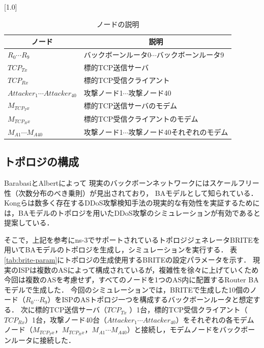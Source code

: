 \documentclass[Japanese]{dicomopapers}
\begin{document}
\begin{table}[htbp]
    \caption{ノードの説明}
    \label{tab:node-description}
    \begin{center}
        \scalebox{0.80}[1.0]{
            \begin{tabular}{ll}
                \hline
                \multicolumn{1}{c}{ノード}             & \multicolumn{1}{c}{説明}        \\ \hline
                $R_{0} \cdots R_{9}$                & バックボーンルータ0$\cdots$バックボーンルータ9  \\
                $TCP_{Tx}$                          & 標的TCP送信サーバ                    \\
                $TCP_{Rx}$                          & 標的TCP受信クライアント                 \\
                $Attacker_{1} \cdots Attacker_{40}$ & 攻撃ノード1$\cdots$攻撃ノード40         \\
                $M_{TCP_Tx}$                        & 標的TCP送信サーバのモデム                \\
                $M_{TCP_Rx}$                        & 標的TCP受信クライアントのモデム             \\
                $M_{A1} \cdots M_{A40}$             & 攻撃ノード1$\cdots$攻撃ノード40それぞれのモデム \\ \hline
            \end{tabular}
        }
    \end{center}
\end{table}

\subsection{トポロジの構成}
BarabasiとAlbertによって
現実のバックボーンネットワークにはスケールフリー性（次数分布のべき乗則）が見出されており，
BAモデルとして知られている\cite{ba-model}．
Kongらは数多く存在するDDoS攻撃検知手法の現実的な有効性を実証するためには，BAモデルのトポロジを用いたDDoS攻撃のシミュレーションが有効であると提案している\cite{random-flow-ddos}．

そこで，上記を参考にns-3でサポートされているトポロジジェネレータBRITE\cite{brite}を用いてBAモデルのトポロジを生成し，シミュレーションを実行する．
表\ref{tab:brite-param}にトポロジの生成使用するBRITEの設定パラメータを示す．
現実のISPは複数のASによって構成されている\cite{realistic-topologies}が，複雑性を徐々に上げていくため今回は複数のASを考慮せず，すべてのノードを1つのAS内に配置するRouter BAモデルで生成した．
今回のシミュレーションでは，BRITEで生成した10個のノード（$R_{0} \cdots R_{9}$）をISPのASトポロジ一つを構成するバックボーンルータと想定する．
次に標的TCP送信サーバ（$TCP_{Tx}$ ）1台，標的TCP受信クライアント（$TCP_{Rx}$）1台，攻撃ノード40台（$Attacker_{1} \cdots Attacker_{40}$）をそれぞれの各モデムノード（$M_{TCP_Tx}$，$M_{TCP_Rx}$，$M_{A1} \cdots M_{A40}$）と接続し，モデムノードをバックボーンルータに接続した．
\end{document}
